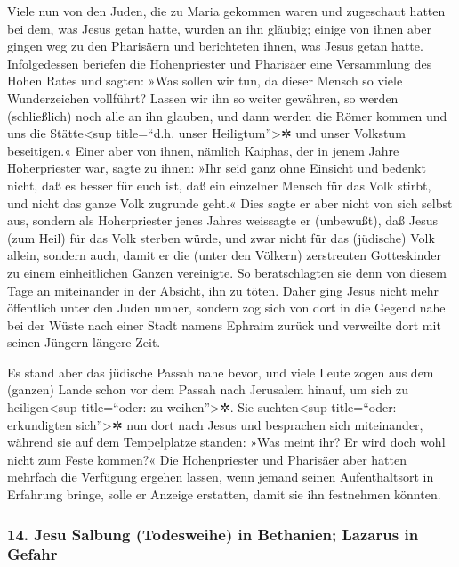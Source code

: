  Viele nun von den Juden, die zu Maria gekommen waren und
zugeschaut hatten bei dem, was Jesus getan hatte, wurden an ihn gläubig;
 einige von ihnen aber gingen weg zu den Pharisäern und
berichteten ihnen, was Jesus getan hatte.  Infolgedessen
beriefen die Hohenpriester und Pharisäer eine Versammlung des Hohen
Rates und sagten: »Was sollen wir tun, da dieser Mensch so viele
Wunderzeichen vollführt?  Lassen wir ihn so weiter
gewähren, so werden (schließlich) noch alle an ihn glauben, und dann
werden die Römer kommen und uns die Stätte\textless sup title=``d.h.
unser Heiligtum''\textgreater✲ und unser Volkstum beseitigen.«
 Einer aber von ihnen, nämlich Kaiphas, der in jenem
Jahre Hoherpriester war, sagte zu ihnen: »Ihr seid ganz ohne Einsicht
 und bedenkt nicht, daß es besser für euch ist, daß ein
einzelner Mensch für das Volk stirbt, und nicht das ganze Volk zugrunde
geht.«  Dies sagte er aber nicht von sich selbst aus,
sondern als Hoherpriester jenes Jahres weissagte er (unbewußt), daß
Jesus (zum Heil) für das Volk sterben würde,  und zwar
nicht für das (jüdische) Volk allein, sondern auch, damit er die (unter
den Völkern) zerstreuten Gotteskinder zu einem einheitlichen Ganzen
vereinigte.  So beratschlagten sie denn von diesem Tage
an miteinander in der Absicht, ihn zu töten.  Daher ging
Jesus nicht mehr öffentlich unter den Juden umher, sondern zog sich von
dort in die Gegend nahe bei der Wüste nach einer Stadt namens Ephraim
zurück und verweilte dort mit seinen Jüngern längere Zeit.

 Es stand aber das jüdische Passah nahe bevor, und viele
Leute zogen aus dem (ganzen) Lande schon vor dem Passah nach Jerusalem
hinauf, um sich zu heiligen\textless sup title=``oder: zu
weihen''\textgreater✲.  Sie suchten\textless sup
title=``oder: erkundigten sich''\textgreater✲ nun dort nach Jesus und
besprachen sich miteinander, während sie auf dem Tempelplatze standen:
»Was meint ihr? Er wird doch wohl nicht zum Feste kommen?«
 Die Hohenpriester und Pharisäer aber hatten mehrfach die
Verfügung ergehen lassen, wenn jemand seinen Aufenthaltsort in Erfahrung
bringe, solle er Anzeige erstatten, damit sie ihn festnehmen könnten.

\hypertarget{jesu-salbung-todesweihe-in-bethanien-lazarus-in-gefahr}{%
\subsubsection{14. Jesu Salbung (Todesweihe) in Bethanien; Lazarus in
Gefahr}\label{jesu-salbung-todesweihe-in-bethanien-lazarus-in-gefahr}}

